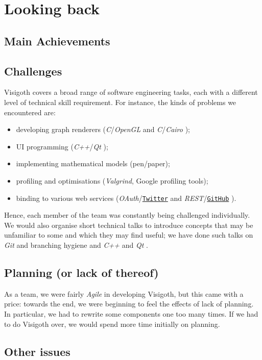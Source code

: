 \documentclass[a4paper,11pt,titlepage]{article}
\let\stdhref\href
\renewcommand{\href}[2]{\stdhref{#1}{\texttt{#2}}}
\let\stdsection\section         %
\renewcommand{\section}{\newpage\stdsection}
\newcommand{\buzz}[1]{\emph{#1}}
\newcommand{\Qt}{\buzz{Qt} }
\newcommand{\OpenGL}{\buzz{OpenGL} }
\newcommand{\Git}{\buzz{Git} }
\newcommand{\Cairo}{\buzz{Cairo} }
\newcommand{\Twitter}{\href{http://twitter.com}{Twitter} }
\newcommand{\GitHub}{\href{https://github.com}{GitHub} }
\begin{document}
\section{Looking back}

\subsection{Main Achievements}

\subsection{Challenges}
Visigoth covers a broad range of software engineering tasks, each with
a different level of technical skill requirement. For instance, the
kinds of problems we encountered are:
\begin{itemize}
\item developing graph renderers (\buzz{C}/\OpenGL and
  \buzz{C}/\Cairo);
\item UI programming (\buzz{C++}/\Qt);
\item implementing mathematical models (pen/paper);
\item profiling and optimisations (\buzz{Valgrind}, Google profiling
  tools);
\item binding to various web services (\buzz{OAuth}/\Twitter and
  \buzz{REST}/\GitHub).
\end{itemize}

Hence, each member of the team was constantly being challenged
individually. We would also organise short technical talks to
introduce concepts that may be unfamiliar to some and which they may
find useful; we have done such talks on \Git and branching hygiene and
\buzz{C++} and \Qt.

\subsection{Planning (or lack of thereof)}

As a team, we were fairly \buzz{Agile} in developing Visigoth, but
this came with a price: towards the end, we were beginning to feel the
effects of lack of planning. In particular, we had to rewrite some
components one too many times. If we had to do Visigoth over, we would
spend more time initially on planning.

\subsection{Other issues}
\end{document}
